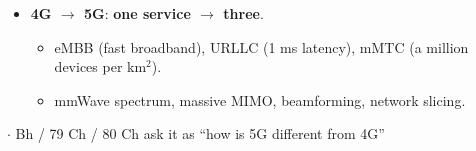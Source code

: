 {\begin{itemize}
\begin{itemize}
    \item MIMO $\rightarrow$ spatial multiplexing $\rightarrow$ capacity rises w/o
          more spectrum.
    \item Scalable bandwidth 1.4 to 20 MHz, and much lower latency.
  \end{itemize}
  \item \textbf{4G $\rightarrow$ 5G}: \textbf{one service $\rightarrow$ three}.
  \begin{itemize}
    \item eMBB (fast broadband), URLLC (1 ms latency), mMTC (a million devices per km$^2$).
    \item mmWave spectrum, massive MIMO, beamforming, network slicing.
  \end{itemize}
\end{itemize}}

\hr


{\color{sub}\footnotesize {} 
\gap$\cdot$ Bh / 79 Ch / 80 Ch ask it as ``how is 5G different from 4G''}

